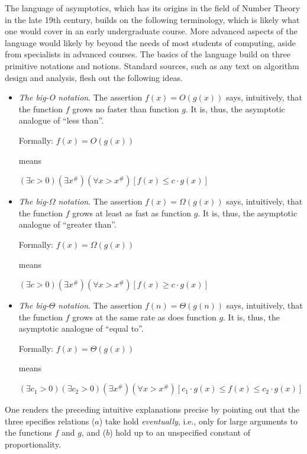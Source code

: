The language of asymptotics, which has its origins in the field of
Number Theory in the late 19th century, builds on the following
terminology, which is likely what one would cover in an early
undergraduate course.  More advanced aspects of the language would
likely by beyond the needs of most students of computing, aside from
specialists in advanced courses.  The basics of the language build on
three primitive notations and notions.  Standard sources, such as any
text on algorithm design and analysis, flesh out the following ideas.
\begin{itemize}
\item
{\em The big-O notation}.
%
The assertion $f(x) = O(g(x))$ says, intuitively, that the function
$f$ grows no faster than function $g$.  It is, thus, the asymptotic
analogue of ``less than''.

Formally:
$f(x) = O(g(x))$

means

$(\exists c >0)(\exists x^{\#})(\forall x > x^{\#})
[f(x) \leq c \cdot g(x)]$

\item
{\em The big-$\Omega$ notation}.
%
The assertion $f(x) = \Omega(g(x))$ says, intuitively, that the
function $f$ grows at least as fast as function $g$.  It is, thus, the
asymptotic analogue of ``greater than''.

Formally:
$f(x) = \Omega(g(x))$

means

$(\exists c >0)(\exists x^{\#})(\forall x > x^{\#})
[f(x) \geq c \cdot  g(x)]$ \\

\item
{\em The big-$\Theta$ notation}.
%
The assertion $f(n) = \Theta(g(n))$ says, intuitively, that the
function $f$ grows at the same rate as does function $g$.  It is,
thus, the asymptotic analogue of ``equal to''.

Formally:
$f(x) = \Theta(g(x))$

means

$(\exists c_1 >0)(\exists c_2 >0)(\exists x^{\#})(\forall x > x^{\#})
[c_1 \cdot g(x) \leq f(x) \leq c_2 \cdot  g(x)]$
\end{itemize}
One renders the preceding intuitive explanations precise by pointing
out that the three specifies relations ($a$) take hold {\em
  eventually}, i.e., only for large arguments to the functions $f$ and
$g$, and ($b$) hold up to an unspecified constant of proportionality.

